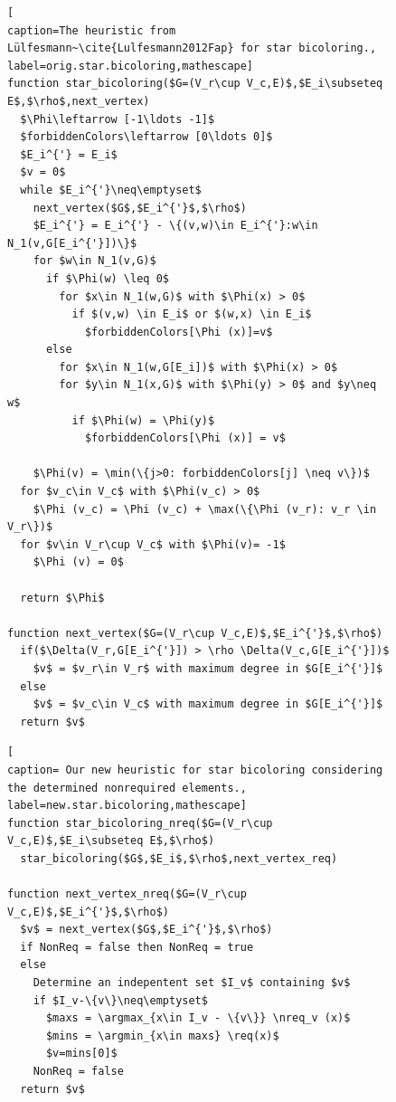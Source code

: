 \documentclass[12pt, twoside,a4paper,toc=bibliography]{scrbook}
\DeclareMathOperator*{\argmin}{arg\,min}
\DeclareMathOperator*{\argmax}{arg\,max}
\newcommand{\nreq}{L}
\newcommand{\req}{M}
\begin{document}
\begin{figure}
\begin{lstlisting}[
caption=The heuristic from Lülfesmann~\cite{Lulfesmann2012Fap} for star bicoloring.,
label=orig.star.bicoloring,mathescape]
function star_bicoloring($G=(V_r\cup V_c,E)$,$E_i\subseteq E$,$\rho$,next_vertex)
  $\Phi\leftarrow [-1\ldots -1]$
  $forbiddenColors\leftarrow [0\ldots 0]$
  $E_i^{'} = E_i$
  $v = 0$
  while $E_i^{'}\neq\emptyset$
    next_vertex($G$,$E_i^{'}$,$\rho$)
    $E_i^{'} = E_i^{'} - \{(v,w)\in E_i^{'}:w\in N_1(v,G[E_i^{'}])\}$
    for $w\in N_1(v,G)$
      if $\Phi(w) \leq 0$
        for $x\in N_1(w,G)$ with $\Phi(x) > 0$
          if $(v,w) \in E_i$ or $(w,x) \in E_i$
            $forbiddenColors[\Phi (x)]=v$
      else
        for $x\in N_1(w,G[E_i])$ with $\Phi(x) > 0$
        for $y\in N_1(x,G)$ with $\Phi(y) > 0$ and $y\neq w$
          if $\Phi(w) = \Phi(y)$
            $forbiddenColors[\Phi (x)] = v$
            
    $\Phi(v) = \min(\{j>0: forbiddenColors[j] \neq v\})$
  for $v_c\in V_c$ with $\Phi(v_c) > 0$
    $\Phi (v_c) = \Phi (v_c) + \max(\{\Phi (v_r): v_r \in V_r\})$
  for $v\in V_r\cup V_c$ with $\Phi(v)= -1$
    $\Phi (v) = 0$

  return $\Phi$

function next_vertex($G=(V_r\cup V_c,E)$,$E_i^{'}$,$\rho$)
  if($\Delta(V_r,G[E_i^{'}]) > \rho \Delta(V_c,G[E_i^{'}])$
    $v$ = $v_r\in V_r$ with maximum degree in $G[E_i^{'}]$
  else
    $v$ = $v_c\in V_c$ with maximum degree in $G[E_i^{'}]$
  return $v$
\end{lstlisting}

\begin{lstlisting}[
caption= Our new heuristic for star bicoloring considering the determined nonrequired elements.,
label=new.star.bicoloring,mathescape]
function star_bicoloring_nreq($G=(V_r\cup V_c,E)$,$E_i\subseteq E$,$\rho$)
  star_bicoloring($G$,$E_i$,$\rho$,next_vertex_req)

function next_vertex_nreq($G=(V_r\cup V_c,E)$,$E_i^{'}$,$\rho$)
  $v$ = next_vertex($G$,$E_i^{'}$,$\rho$)
  if NonReq = false then NonReq = true
  else
    Determine an indepentent set $I_v$ containing $v$
    if $I_v-\{v\}\neq\emptyset$
      $maxs = \argmax_{x\in I_v - \{v\}} \nreq_v (x)$
      $mins = \argmin_{x\in maxs} \req(x)$ 
      $v=mins[0]$
    NonReq = false
  return $v$
\end{lstlisting}
\end{figure}
\end{document}
